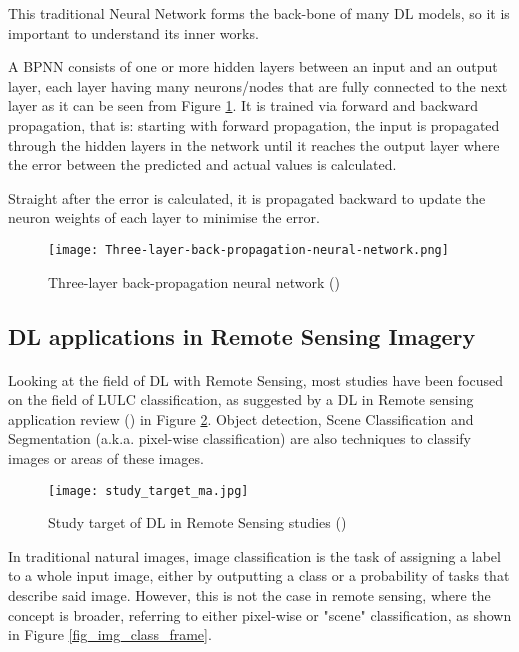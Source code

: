 This traditional Neural Network forms the back-bone of many \gls{DL} models, so it is important to understand its inner works.

A \gls{BPNN} consists of one or more hidden layers between an input and an output layer, each layer having many neurons/nodes that are fully connected to the next layer as it can be seen from Figure \ref{fig_bpnn}.  It is trained via forward and backward propagation, that is: starting with forward propagation, the input is propagated through the hidden layers in the network until it reaches the output layer where the error between the predicted and actual values is calculated. 

Straight after the error is calculated, it is propagated backward to update the neuron weights of each layer to minimise the error.

    \begin{figure}[hbt!]
        \centering
        \texttt{[image: Three-layer-back-propagation-neural-network.png]}
        \caption{Three-layer back-propagation neural network (\cite{NNpic})}
        \label{fig_bpnn}
    \end{figure}

\subsection{\gls{DL} applications in Remote Sensing Imagery} \label{dl_rs}
\paragraph{}
Looking at the field of \gls{DL} with Remote Sensing, most studies have been focused on the field of \gls{LULC} classification, as suggested by a \gls{DL} in Remote sensing application review (\cite{MA2019166}) in Figure \ref{fig_dl_studies}. Object detection, Scene Classification and Segmentation (\gls{a.k.a.} pixel-wise classification) are also techniques to classify images or areas of these images.

    \begin{figure}[hbt!]
        \centering
        \texttt{[image: study\_target\_ma.jpg]}
        \caption{Study target of \gls{DL} in Remote Sensing studies (\cite{MA2019166})}
        \label{fig_dl_studies}
    \end{figure}

In traditional natural images, image classification is the task of assigning a label to a whole input image, either by outputting a class or a probability of tasks that describe said image. However, this is not the case in remote sensing, where the concept is broader, referring to either pixel-wise or "scene" classification, as shown in Figure \ref{fig_img_class_frame}.


